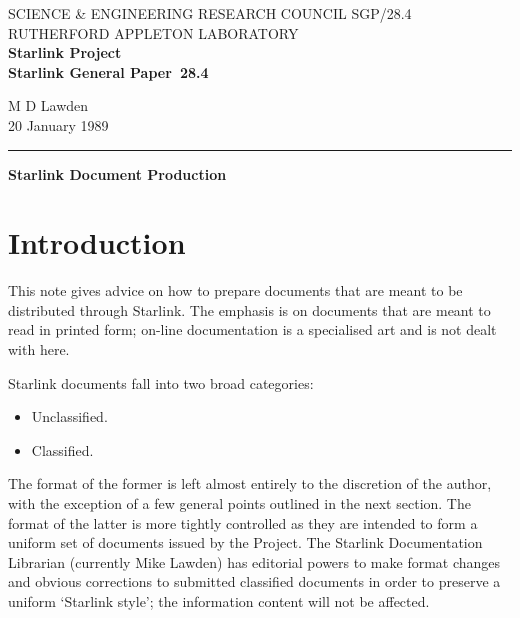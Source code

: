 \pagestyle{myheadings}

\newcommand{\stardoccategory}  {Starlink General Paper}
\newcommand{\stardocinitials}  {SGP}
\newcommand{\stardocnumber}    {28.4}
\newcommand{\stardocauthors}   {M D Lawden}
\newcommand{\stardocdate}      {20 January 1989}
\newcommand{\stardoctitle}     {Starlink Document Production}

\newcommand{\stardocname}{\stardocinitials /\stardocnumber}
\markright{\stardocname}
\setlength{\textwidth}{160mm}
\setlength{\textheight}{240mm}
\setlength{\topmargin}{-5mm}
\setlength{\oddsidemargin}{0mm}
\setlength{\evensidemargin}{0mm}
\setlength{\parindent}{0mm}
\setlength{\parskip}{\medskipamount}
\setlength{\unitlength}{1mm}


\thispagestyle{empty}
SCIENCE \& ENGINEERING RESEARCH COUNCIL \hfill \stardocname\\
RUTHERFORD APPLETON LABORATORY\\
{\large\bf Starlink Project\\}
{\large\bf \stardoccategory\ \stardocnumber}
\begin{flushright}
\stardocauthors\\
\stardocdate
\end{flushright}
\vspace{-4mm}
\rule{\textwidth}{0.5mm}
\vspace{5mm}
\begin{center}
{\Large\bf \stardoctitle}
\end{center}
\vspace{5mm}

\section{Introduction}

This note gives advice on how to prepare documents that are meant to be
distributed through Starlink.
The emphasis is on documents that are meant to read in printed form; on-line
documentation is a specialised art and is not dealt with here.

Starlink documents fall into two broad categories:
\begin{itemize}
\item Unclassified.
\item Classified.
\end{itemize}
The format of the former is left almost entirely to the discretion of the
author, with the exception of a few general points outlined in the next section.
The format of the latter is more tightly controlled as they are intended to form
a uniform set of documents issued by the Project.
The Starlink Documentation Librarian (currently Mike Lawden) has editorial
powers to make format changes and obvious corrections to submitted classified
documents in order to preserve a uniform `Starlink style'; the information
content will not be affected.

